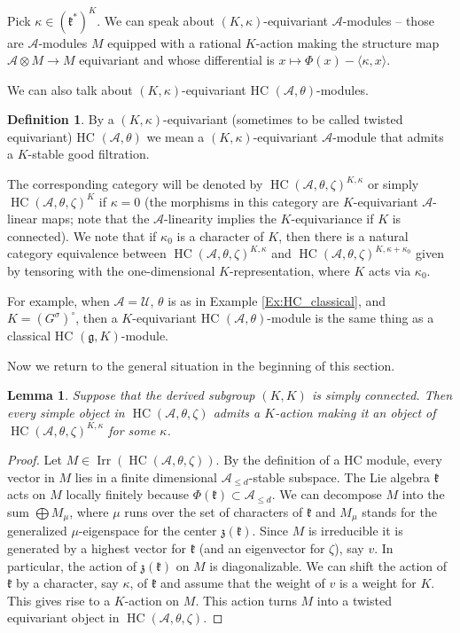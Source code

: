 \documentclass[12pt]{amsart}
\newcommand{\A}{\mathcal{A}}
\newcommand{\U}{\mathcal{U}}
\newcommand{\g}{\mathfrak{g}}
\newcommand{\kf}{\mathfrak{k}}
\newcommand{\HC}{\operatorname{HC}}
\newtheorem{Lem}[Thm]{Lemma}
\theoremstyle{definition}
\newtheorem{defi}[Thm]{Definition}
\numberwithin{equation}{section}
\begin{document}
Pick $\kappa\in (\kf^*)^K$.
We can speak about $(K,\kappa)$-equivariant $\A$-modules -- those are $\A$-modules $M$
equipped with a rational $K$-action making the structure map $\A\otimes M\rightarrow M$
equivariant and whose differential is $x\mapsto \Phi(x)-\langle\kappa,x\rangle$.


We can also talk about $(K,\kappa)$-equivariant HC $(\A,\theta)$-modules.

\begin{defi}\label{eq:HC_equiv}
By a  $(K,\kappa)$-equivariant (sometimes to be called twisted equivariant) HC $(\A,\theta)$ we mean a $(K,\kappa)$-equivariant $\A$-module that admits a $K$-stable good filtration.
\end{defi}

The corresponding category will be
denoted by $\HC(\A,\theta,\zeta)^{K,\kappa}$ or simply
$\HC(\A,\theta,\zeta)^K$ if $\kappa=0$ (the morphisms in this category are $K$-equivariant $\A$-linear maps; note that the $\A$-linearity implies the $K$-equivariance if $K$ is connected). We note that if $\kappa_0$
is a character of $K$, then there is a natural category
equivalence between $\HC(\A,\theta,\zeta)^{K,\kappa}$
and $\HC(\A,\theta,\zeta)^{K,\kappa+\kappa_0}$ given by tensoring
with the one-dimensional $K$-representation, where $K$
acts via $\kappa_0$.

For example, when $\A=\U$, $\theta$ is as in Example \ref{Ex:HC_classical},
and $K=(G^\sigma)^\circ$, then a $K$-equivariant HC $(\A,\theta)$-module
is the same thing as a classical HC $(\g,K)$-module.

Now we return to the general situation in the beginning of this section.

\begin{Lem}\label{Lem:twisted_equivar}
Suppose that the derived subgroup $(K,K)$ is simply connected. Then
every simple object in $\HC(\A,\theta,\zeta)$ admits a $K$-action making it
an object of $\HC(\A,\theta,\zeta)^{K,\kappa}$ for some $\kappa$.
\end{Lem}
\begin{proof}
Let $M\in \operatorname{Irr}(\HC(\A,\theta,\zeta))$. By the definition of a HC module,
every vector in $M$ lies in a finite dimensional $\A_{\leqslant d}$-stable
subspace.  The Lie algebra $\kf$
acts on $M$ locally finitely because $\Phi(\kf)\subset \A_{\leqslant d}$. We can decompose $M$ into the
sum $\bigoplus M_{\mu}$, where $\mu$ runs over the set of characters of $\kf$
and $M_{\mu}$ stands for the generalized $\mu$-eigenspace for the center $\mathfrak{z}(\kf)$.
Since $M$ is irreducible it is generated by a highest vector for $\kf$ (and an eigenvector for $\zeta$), say $v$. In particular,
the action of $\mathfrak{z}(\kf)$  on $M$ is diagonalizable. We can shift the
action of $\kf$ by a character, say $\kappa$, of $\kf$ and assume that the weight of
$v$ is a weight for $K$. This gives rise to a $K$-action on $M$.
This action turns $M$ into  a twisted equivariant object in
$\HC(\A,\theta,\zeta)$.
\end{proof}
\end{document}
